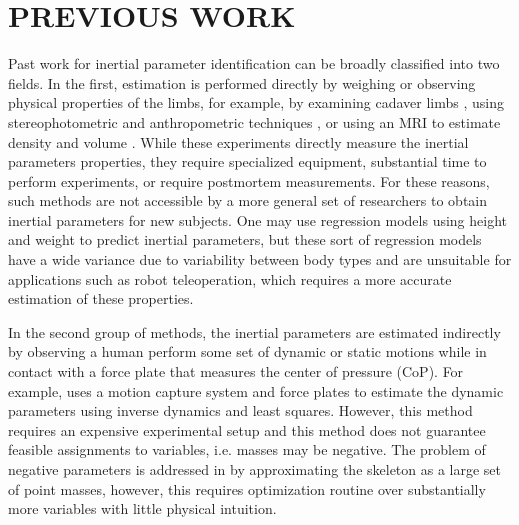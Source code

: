 \section{PREVIOUS WORK}
Past work for inertial parameter identification can be broadly classified into two fields.
In the first, estimation is performed directly by weighing or observing physical properties of the limbs, for example, by examining cadaver limbs \cite{chandler1975investigation}, using stereophotometric and anthropometric techniques \cite{mcconville1980anthropometric,armstrong1988anthropometry}, or using an MRI to estimate density and volume \cite{cheng2000segment,pearsall1994inertial}.
While these experiments directly measure the inertial parameters properties, they require specialized equipment, substantial time to perform experiments, or require postmortem measurements. For these reasons, such methods are not accessible by a more general set of researchers to obtain inertial parameters for new subjects. One may use regression models \cite{chandler1975investigation} using height and weight to predict inertial parameters, but these sort of regression models have a wide variance due to variability between body types and are unsuitable for applications such as robot teleoperation, which requires a more accurate estimation of these properties.

In the second group of methods, the inertial parameters are estimated indirectly by observing a human perform some set of dynamic or static motions while in contact with a force plate that measures the center of pressure (CoP). 
For example, \cite{venture2008motion} uses a motion capture system and force plates to estimate the dynamic parameters using inverse dynamics and least squares. However, this method requires an expensive experimental setup and this method does not guarantee feasible assignments to variables, i.e. masses may be negative. 
The problem of negative parameters is addressed in \cite{ayusawa2011real} by approximating the skeleton as a large set of point masses, however, this requires optimization routine over substantially more variables with little physical intuition. %



